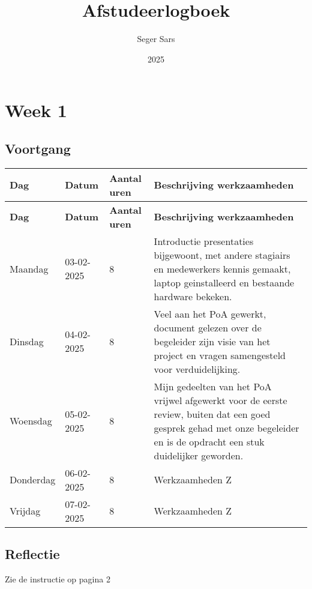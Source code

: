 \documentclass[a4paper,12pt]{article}
\title{Afstudeerlogboek}
\author{Seger Sars}
\date{2025}
\begin{document}
\maketitle

\newpage

\section*{Week 1}

\subsection*{Voortgang}

\begin{longtable}{|l|l|p{}|p{}|}
\hline
\textbf{Dag} & \textbf{Datum} & \textbf{Aantal uren} & \textbf{Beschrijving werkzaamheden} \\
\hline
\endfirsthead
\hline
\textbf{Dag} & \textbf{Datum} & \textbf{Aantal uren} & \textbf{Beschrijving werkzaamheden} \\
\hline
\endhead
\hline
\endfoot
\endlastfoot
Maandag   & 03-02-2025 & 8 & Introductie presentaties bijgewoont, met andere stagiairs en medewerkers kennis gemaakt, laptop geinstalleerd en bestaande hardware bekeken. \\ \hline
Dinsdag   & 04-02-2025 & 8 & Veel aan het PoA gewerkt, document gelezen over de begeleider zijn visie van het project en vragen samengesteld voor verduidelijking. \\ \hline
Woensdag  & 05-02-2025 & 8 & Mijn gedeelten van het PoA vrijwel afgewerkt voor de eerste review, buiten dat een goed gesprek gehad met onze begeleider en is de opdracht een stuk duidelijker geworden. \\ \hline
Donderdag & 06-02-2025 & 8 & Werkzaamheden Z \\ \hline
Vrijdag   & 07-02-2025 & 8 & Werkzaamheden Z \\ \hline

\hline

\end{longtable}

\subsection*{Reflectie}

Zie de instructie op pagina 2


\newpage
\end{document}
